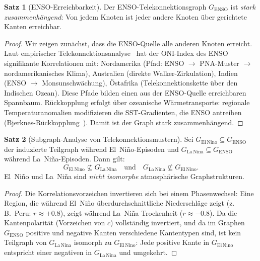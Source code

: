 ﻿\documentclass[a4paper,12pt]{article}
\theoremstyle{definition}
\newtheorem{satz}{Satz}
\begin{document}
\begin{satz}[ENSO-Erreichbarkeit]
\label{satz:enso_reach}
Der ENSO-Telekonnektionsgraph $G_{\mathrm{ENSO}}$ ist \emph{stark zusammenh\"angend}:
Von jedem Knoten ist jeder andere Knoten \"uber gerichtete Kanten erreichbar.
\end{satz}

\begin{proof}
Wir zeigen zun\"achst, dass die ENSO-Quelle alle anderen Knoten erreicht.
Laut empirischer Telekonnektionsanalyse~\cite{trenberth1998} hat der ONI-Index
des ENSO signifikante Korrelationen mit:
Nordamerika (Pfad: ENSO $\to$ PNA-Muster $\to$ nordamerikanisches Klima),
Australien (direkte Walker-Zirkulation),
Indien (ENSO $\to$ Monsunschwächung),
\"Ostafrika (Telekonnektionskette \"uber den Indischen Ozean).
Diese Pfade bilden einen aus der ENSO-Quelle erreichbaren Spannbaum.
R\"uckkopplung erfolgt \"uber ozeanische W\"armetransporte: regionale
Temperaturanomalien modifizieren die SST-Gradienten, die ENSO antreiben
(Bjerknes-R\"uckkopplung~\cite{bjerknes1969}).
Damit ist der Graph stark zusammenh\"angend.
\end{proof}

\begin{satz}[Subgraph-Analyse von Telekonnektionsmustern]
\label{satz:tele_subgraph}
Sei $G_{\mathrm{El\,Nino}} \subseteq G_{\mathrm{ENSO}}$ der induzierte Teilgraph
w\"ahrend El~Ni\~no-Episoden und $G_{\mathrm{La\,Nina}} \subseteq G_{\mathrm{ENSO}}$
w\"ahrend La~Ni\~na-Episoden. Dann gilt:
\[
G_{\mathrm{El\,Nino}} \not\subseteq G_{\mathrm{La\,Nina}} \quad \text{und} \quad
G_{\mathrm{La\,Nina}} \not\subseteq G_{\mathrm{El\,Nino}}.
\]
El~Ni\~no und La~Ni\~na sind \emph{nicht isomorphe} atmosph\"arische Graphstrukturen.
\end{satz}

\begin{proof}
Die Korrelationsvorzeichen invertieren sich bei einem Phasenwechsel: Eine Region,
die w\"ahrend El~Ni\~no \"uberdurchschnittliche Niederschl\"age zeigt
(z.\,B.\ Peru: $r \approx +0.8$), zeigt w\"ahrend La~Ni\~na Trockenheit
($r \approx -0.8$). Da die Kantenpolarit\"at (Vorzeichen von $c$) vollst\"andig
invertiert, und da im Graphen $G_{\mathrm{ENSO}}$ positive und negative Kanten
verschiedene Kantentypen sind, ist kein Teilgraph von $G_{\mathrm{La\,Nina}}$
isomorph zu $G_{\mathrm{El\,Nino}}$: Jede positive Kante in $G_{\mathrm{El\,Nino}}$
entspricht einer negativen in $G_{\mathrm{La\,Nina}}$ und umgekehrt.
\end{proof}
\end{document}
